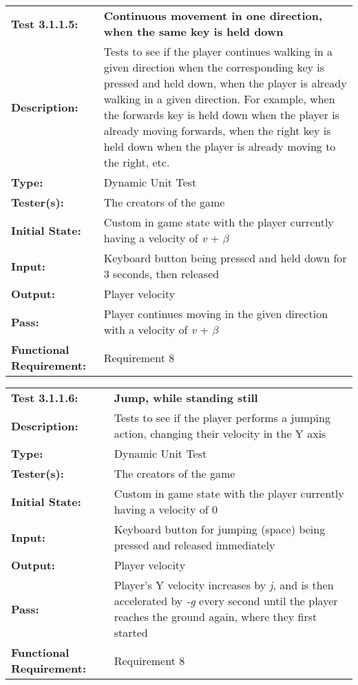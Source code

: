 \documentclass[12pt, titlepage]{article}
\begin{document}
\begin{mdframed}[linewidth=1pt]
\begin{tabularx}{\textwidth}{@{}p{3cm}X@{}}
{\bf Test 3.1.1.5:} & {\bf Continuous movement in one direction, when the same key is held down}\\[\baselineskip]
{\bf Description:} & Tests to see if the player continues walking in a given direction when the corresponding key is pressed and held down, when the player is already walking in a given direction. For example, when the forwards key is held down when the player is already moving forwards, when the right key is held down when the player is already moving to the right, etc.\\[0.5\baselineskip]
{\bf Type:} & Dynamic Unit Test\\[0.5\baselineskip]
{\bf Tester(s):} & The creators of the game\\[0.5\baselineskip]
{\bf Initial State:} & Custom in game state with the player currently having a velocity of \textit{v} + $\beta$ \\[0.5\baselineskip]
{\bf Input:} & Keyboard button being pressed and held down for 3 seconds, then released\\[0.5\baselineskip]
{\bf Output:} & Player velocity\\[0.5\baselineskip]
{\bf Pass:} & Player continues moving in the given direction with a velocity of \textit{v} + $\beta$ \\[0.5\baselineskip]
{\bf Functional Requirement:} & Requirement 8
\end{tabularx}
\end{mdframed}


\begin{mdframed}[linewidth=1pt]
\begin{tabularx}{\textwidth}{@{}p{3cm}X@{}}
{\bf Test 3.1.1.6:} & {\bf Jump, while standing still}\\[\baselineskip]
{\bf Description:} & Tests to see if the player performs a jumping action, changing their velocity in the Y axis\\[0.5\baselineskip]
{\bf Type:} & Dynamic Unit Test\\[0.5\baselineskip]
{\bf Tester(s):} & The creators of the game\\[0.5\baselineskip]
{\bf Initial State:} & Custom in game state with the player currently having a velocity of 0\\[0.5\baselineskip]
{\bf Input:} & Keyboard button for jumping (space) being pressed and released immediately\\[0.5\baselineskip]
{\bf Output:} & Player velocity\\[0.5\baselineskip]
{\bf Pass:} & Player's Y velocity increases by \textit{j}, and is then accelerated by \textit{-g} every second until the player reaches the ground again, where they first started \\[0.5\baselineskip]
{\bf Functional Requirement:} & Requirement 8
\end{tabularx}
\end{mdframed}
\end{document}
